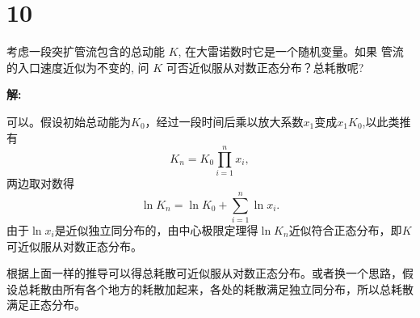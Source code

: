 \documentclass[12pt,a4]{ctexart}
\begin{document}
\section{10}

考虑一段突扩管流包含的总动能 $K$, 在大雷诺数时它是一个随机变量。如果 管流的入口速度近似为不变的, 问 $K$ 可否近似服从对数正态分布？总耗散呢?

\textsf{\hspace{-2em}\sf  \textbf{解:}}

可以。假设初始总动能为$K_0$，经过一段时间后乘以放大系数$x_1$变成$x_1K_0$,以此类推有
\begin{equation}
	K_n = K_0 \prod_{i=1}^{n} x_i,
\end{equation}
两边取对数得
\begin{equation}
	\ln K_n = \ln K_0 +  \sum_{i=1}^{n} \ln x_i.
\end{equation}
由于$\ln x_i$是近似独立同分布的，由中心极限定理得$\ln K_n$近似符合正态分布，即$K$可近似服从对数正态分布。

根据上面一样的推导可以得总耗散可近似服从对数正态分布。或者换一个思路，假设总耗散由所有各个地方的耗散加起来，各处的耗散满足独立同分布，所以总耗散满足正态分布。




\end{document}
